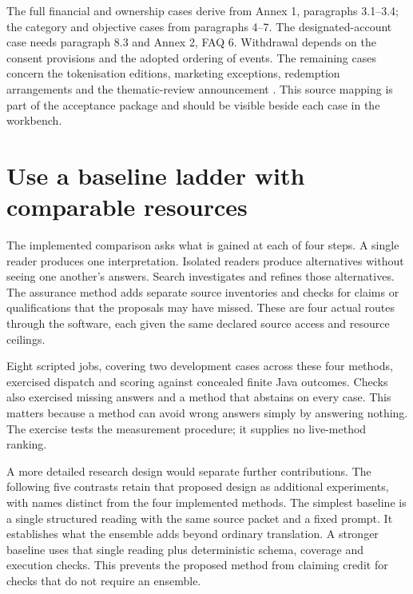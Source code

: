 
The full financial and ownership cases derive from Annex 1, paragraphs 3.1--3.4;
the category and objective cases from paragraphs 4--7. The designated-account
case needs paragraph 8.3 and Annex 2, FAQ 6. Withdrawal depends on the consent
provisions and the adopted ordering of events. The remaining cases concern the
tokenisation editions, marketing exceptions, redemption arrangements and the
thematic-review announcement
\citep{sfcspiannex1,sfcspiannex2,sfctoken2023,sfctoken2026,sfcmarketing,sfcreview2025}.
This source mapping is part of the acceptance package and should be visible
beside each case in the workbench.

\section{Use a baseline ladder with comparable resources}
\label{merge:M09:04}


The implemented comparison asks what is gained at each of four steps. A single
reader produces one interpretation. Isolated readers produce alternatives
without seeing one another's answers. Search investigates and refines those
alternatives. The assurance method adds separate source inventories and checks
for claims or qualifications that the proposals may have missed. These are four
actual routes through the software, each given the same declared source access
and resource ceilings.

Eight scripted jobs, covering two development cases across these four methods,
exercised dispatch and scoring against concealed finite Java outcomes. Checks
also exercised missing answers and a method that abstains on every case. This
matters because a method can avoid wrong answers simply by answering nothing.
The exercise tests the measurement procedure; it supplies no live-method ranking.

A more detailed research design would separate further contributions. The
following five contrasts retain that proposed design as additional experiments,
with names distinct from the four implemented methods. The simplest baseline
is a single structured reading with the same source packet
and a fixed prompt. It establishes what the ensemble adds beyond ordinary
translation. A stronger baseline uses that single reading plus deterministic
schema, coverage and execution checks. This prevents the proposed method from
claiming credit for checks that do not require an ensemble.


